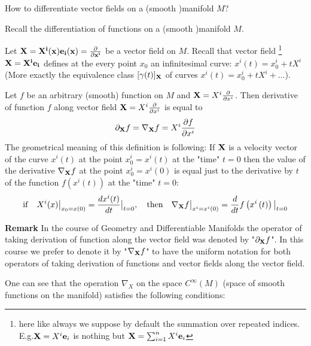 \documentclass[12pt]{article}
\theoremstyle{theorem}
\numberwithin{equation}{section}
\begin{document}
How to differentiate vector fields on a (smooth )manifold  $M$?


Recall  the differentiation  of functions on a (smooth )manifold  $M$.







Let $\bf X=X^i(x){\bf e}_i(x)={\partial\over \partial x^i}$ be a vector field on $M$.
Recall that vector field
\footnote{here like always we suppose by default the summation over repeated indices.
E.g.${\bf X}=X^i{\bf e}_i$ is nothing but
${\bf X}=\sum_{i=1}^nX^i{\bf e}_i$}
 $\bf X=X^i{\bf e}_i$ defines at the
every point $x_0$ an infinitesimal curve: $x^i(t)=x^i_0+tX^i$
(More exactly the equivalence class $[\gamma(t)]_{\bf X} $
of curves $x^i(t)=x^i_0+tX^i+\dots$).


Let $f$ be an arbitrary (smooth) function on $M$ and ${\bf X}=X^i{\partial\over \partial x^i}$.
 Then derivative
of function $f$ along vector field ${\bf X}=X^i{\partial\over \partial x^i}$ is equal to
                              $$
             \partial_{\bf X}f= \nabla_{\bf X}f
                  =X^i{\partial f\over \partial x^i}
                                $$
The geometrical meaning of this definition is following:
If ${\bf X}$ is a velocity vector of the curve $x^i(t)$ at the point $x^i_0=x^i(t)$ at the "time"
$t=0$ then the value of the derivative $\nabla_{\bf X}f$ at the point $x^i_0=x^i(0)$
is equal just to the derivative by $t$ of the function $f(x^i(t))$ at the "time" $t=0$:
\begin{equation}\label{meaningofderivative}
{\rm if}\quad
    X^i(x)\big\vert_{x_0=x(0)}={dx^i(t)\over dt}\big\vert_{t=0},\quad
    {\rm then}\quad
\nabla_{\bf X} f\big\vert_{x^i=x^i(0)}=
{d\over dt}f\left(x^i\left(t\right)\right)\big\vert_{t=0}
\end{equation}


{\bf Remark} In the course of Geometry and Differentiable Manifolds the operator
 of taking derivation of function along the vector field
was denoted by "$\partial_{\bf X}f$". In this course we prefer to denote it by "$\nabla_{\bf X}f$"
to have the uniform notation for both operators of taking derivation of functions and vector fields
along the vector field.


One can see that the operation $\nabla_X$ on the space $C^\infty(M)$ (space of smooth functions on the manifold)
 satisfies the following conditions:
\end{document}
